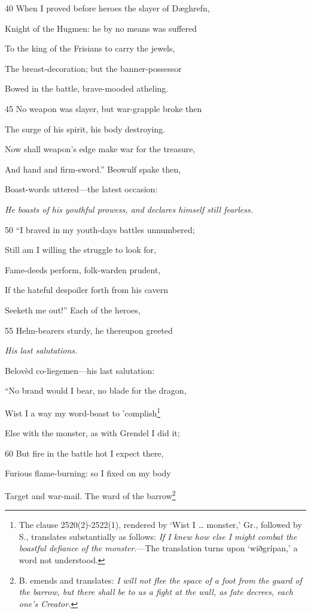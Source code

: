 40
When I proved before heroes the slayer of Dæghrefn,

Knight of the Hugmen: he by no means was suffered

To the king of the Frisians to carry the jewels,

The breast-decoration; but the banner-possessor

Bowed in the battle, brave-mooded atheling.

45
No weapon was slayer, but war-grapple broke then

The surge of his spirit, his body destroying.

Now shall weapon’s edge make war for the treasure,

And hand and firm-sword.” Beowulf spake then,

Boast-words uttered—the latest occasion:

\emph{He boasts of his
youthful prowess,
and declares himself
still fearless.}

50
“I braved in my youth-days battles unnumbered;

Still am I willing the struggle to look for,

Fame-deeds perform, folk-warden prudent,

If the hateful despoiler forth from his cavern

Seeketh me out!” Each of the heroes,

55
Helm-bearers sturdy, he thereupon greeted

\emph{His last salutations.}

Belovèd co-liegemen—his last salutation:

“No brand would I bear, no blade for the dragon,

Wist I a way my word-boast to ’complish\footnote{The clause 2520(2)-2522(1), rendered by ‘Wist I … monster,’ Gr.,
followed by S., translates substantially as follows: \emph{If I knew how else I might
combat the boastful defiance of the monster}.—The translation turns upon
‘wiðgrípan,’ a word not understood.}

Else with the monster, as with Grendel I did it;

60
But fire in the battle hot I expect there,

Furious flame-burning: so I fixed on my body

Target and war-mail. The ward of the barrow\footnote{B. emends and translates: \emph{I will not flee the space of a foot from the guard
of the barrow, but there shall be to us a fight at the wall, as fate decrees, each
one’s Creator.}}

